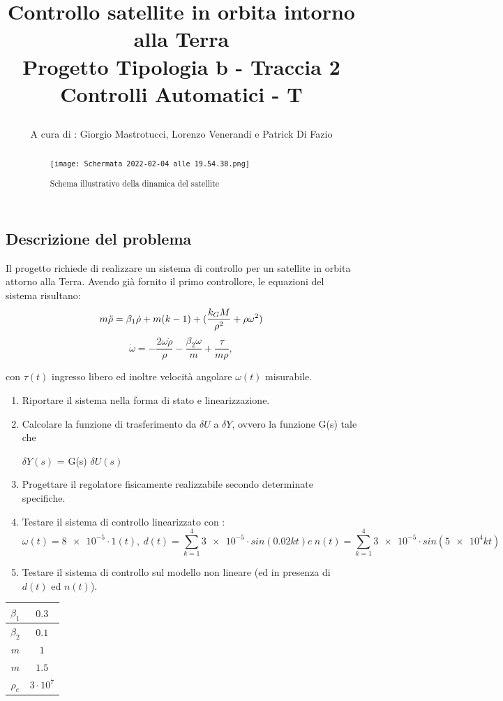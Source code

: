 \documentclass{article}
\title{
Controllo satellite in orbita intorno alla Terra\\
  \large Progetto Tipologia b - Traccia 2 \\
Controlli Automatici - T

}
\author{A cura di : Giorgio Mastrotucci, Lorenzo Venerandi e Patrick Di Fazio}
\date{}
\begin{document}
\maketitle

\begin{abstract}
\begin{figure}[h!]
\centering
\texttt{[image: Schermata 2022-02-04 alle 19.54.38.png]}
\caption{\label{fig:orbit}Schema illustrativo della dinamica del satellite}
\end{figure}
\end{abstract}

\begin{center}
\section*{Descrizione del problema}
\end{center}
Il progetto richiede di realizzare un sistema di controllo per un satellite in orbita attorno alla Terra.
Avendo già fornito il primo controllore, le equazioni del sistema risultano:
\[m \Ddot{\rho} = \beta_1\Dot{\rho} + m(k-1)+  (\frac{k_G M}{\rho^{2}} + \rho \omega^{2}) \]
\[\Dot{\omega} = -\frac{2\omega \Dot{\rho} }{\rho} -
\frac{\beta_2 \omega }{m}+ \frac{\tau}{m \rho} ,\]

con $\tau(t)$ ingresso libero ed inoltre velocità angolare $\omega(t)$ misurabile.


\begin{enumerate}
\item Riportare il sistema nella forma di stato e linearizzazione.
\item Calcolare la funzione di trasferimento da $\delta U$  a  $\delta Y$,  ovvero la funzione G(s) tale che  \begin{center} $\delta Y (s)$ = G(s) $\delta U (s)$ \end{center}
\item Progettare il regolatore fisicamente realizzabile secondo determinate specifiche.
\item Testare il sistema di controllo linearizzato con :
\[	\omega(t)=\num{8e-5} \cdot 1(t) , \ d(t)= \sum_{k=1}^4 \num{3e-5}\cdot sin(0.02kt) e \  n(t)= \sum_{k=1}^4 \num{3e-5}\cdot sin(\num{5e4}kt)\]
\item Testare il sistema di controllo sul modello non lineare (ed in presenza di $d(t)$ ed $n(t)$).
\end{enumerate}


\begin{center}
\begin{tabular}{||c | c ||} 

 \hline\hline
 $\beta_1$ & $0.3$ \\ 
 \hline
 $\beta_2$ & $0.1$  \\
 \hline
 $m$ & $1$ \\
 \hline
 $m$  & $1.5$  \\
 \hline
 $\rho_e $  & $3\cdot 10^{7}$ \\ [2ex] 
 \hline
\end{tabular}
\end{center}
\end{document}
